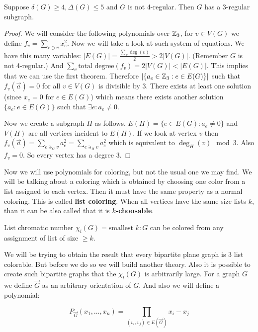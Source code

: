 \begin{thm}
	Suppose $\delta(G) \geq 4, \Delta(G) \leq 5$ and $G$ is not 4-regular. Then $G$ has a $3$-regular subgraph.
\end{thm}

\begin{proof}
	We will consider the following polynomials over $\mathbb{Z}_{3}$, for $v \in V(G)$ we define $f_{v} = \sum_{e \ni v} x_{e}^{2}$. Now we will take a look at such system of equations. We have this many variables: $|E(G)| = \frac{\sum_{v} \deg(v)}{2} > 2|V(G)|$. (Remember $G$ is not 4-regular.) And $\sum_{v} \text{total degree}(f_v) = 2|V(G)| < |E(G)|$. This implies that we can use the first theorem. Therefore $|\{a_{e} \in \mathbb{Z}_{3} : e \in E(G)\}|$ such that $f_{v}(\overrightarrow{a}) =0$ for all $v \in V(G)$ is divisible by 3. There exists at least one solution (since $x_{e} = 0$ for $e \in E(G)$) which means there exists another solution $\{a_{e} : e \in E(G)\}$ such that $\exists e : a_{e} \neq 0$.
	
	Now we create a subgraph $H$ as follows. $E(H) = \{e \in E(G) : a_{e} \neq 0\}$ and $V(H)$ are all vertices incident to $E(H)$. If we look at vertex $v$ then $f_{v}(\overrightarrow{a}) = \sum_{e \ni_{G} v} a_{e}^{2} = \sum_{e \ni_{H} v} a_{e}^{2}$ which is equivalent to $\deg_{H}(v) \mod 3$. Also $f_{v} = 0$. So every vertex has a degree 3.
\end{proof}

Now we will use polynomials for coloring, but not the usual one we may find. We will be talking about a coloring which is obtained by choosing one color from a list assigned to each vertex. Then it must have the same property as a normal coloring. This is called \textbf{list coloring}. When all vertices have the same size lists $k$, than it can be also called that it is \textbf{$k$-choosable}.

\begin{defn}
	List chromatic number $\chi_{l}(G) = \text{smallest } k : G$ can be colored from any assignment of list of size $\geq k$.
\end{defn}

We will be trying to obtain the result that every bipartite plane graph is $3$ list colorable. But before we do so we will build another theory. Also it is possible to create such bipartite graphs that the $\chi_{l}(G)$ is arbitrarily large. For a graph $G$ we define $\overrightarrow{G}$ as an arbitrary orientation of $G$. And also we will define a polynomial:

$$
P_{\overrightarrow{G}} (x_{1}, \dots, x_{n}) = \prod_{(v_{i},v_{j}) \in E(\overrightarrow{G})} x_{i} - x_{j}
$$

